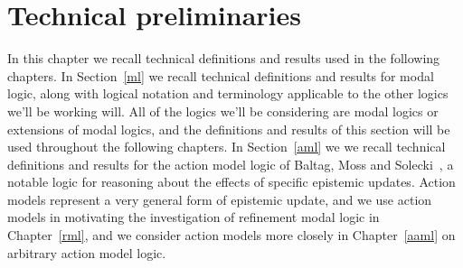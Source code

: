 \chapter{Technical preliminaries}\label{technical}

In this chapter we recall technical definitions and results used in the following chapters.
In Section~\ref{ml} we recall technical definitions and results for modal logic, along with logical notation and terminology applicable to the other logics we'll be working will.
All of the logics we'll be considering are modal logics or extensions of modal logics, and the definitions and results of this section will be used throughout the following chapters. 
In Section~\ref{aml} we we recall technical definitions and results for the action model logic of Baltag, Moss and Solecki~\cite{baltag:1998,baltag:2004}, a notable logic for reasoning about the effects of specific epistemic updates.
Action models represent a very general form of epistemic update, and we use action models in motivating the investigation of refinement modal logic in Chapter~\ref{rml}, and we consider action models more closely in Chapter~\ref{aaml} on arbitrary action model logic.

\pagebreak



